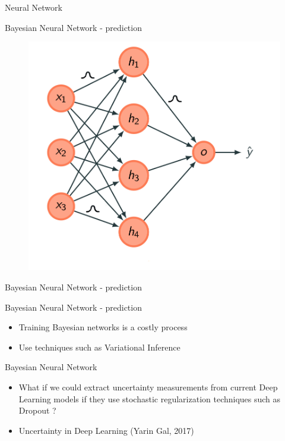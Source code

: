 \documentclass[10pt]{beamer}
\begin{document}
\begin{frame}[fragile]{Neural Network}
    
\end{frame}

\begin{frame}[fragile]{Bayesian Neural Network - prediction}
    \begin{figure}[htp]
        \centering
        \includegraphics[scale=0.3]{images/bayesian_neural_network.png}
    \end{figure}
\end{frame}

\begin{frame}[fragile]{Bayesian Neural Network - prediction}
    
\end{frame}

\begin{frame}[fragile]{Bayesian Neural Network - prediction}
\begin{itemize}
\item Training Bayesian networks is a costly process
\vspace{0.5cm}
\item Use techniques such as Variational Inference
\end{itemize}
\end{frame}

\begin{frame}[fragile]{Bayesian Neural Network}
\begin{itemize}
\item What if we could extract uncertainty measurements from current Deep
    Learning models if they use stochastic regularization techniques such as
    \alert{Dropout} ?
\vspace{0.5cm}
\item Uncertainty in Deep Learning (Yarin Gal, 2017)
\end{itemize}
\end{frame}
\end{document}
